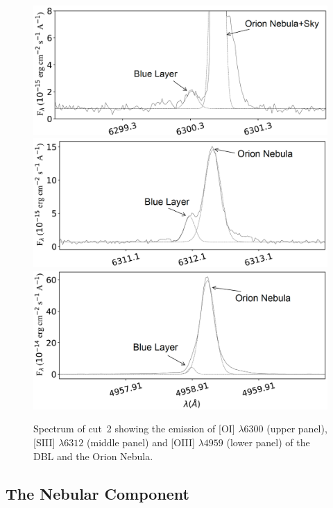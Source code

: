 \documentclass[twocolumn,linenumbers]{aastex63}
\newcommand{\jorge}[1]{{\color{magenta}J: #1}}
\begin{document}
\begin{figure}
\centering
\includegraphics[width=\columnwidth]{cut2_6300.pdf}
\includegraphics[width=\columnwidth]{cut2_6312.pdf}
\includegraphics[width=\columnwidth]{cut2_4959.pdf}
\caption{Spectrum of cut~2 showing the emission of [O\thinspace I] $\lambda 6300$ (upper panel), [S\thinspace III] $\lambda 6312$ (middle panel) and [O\thinspace III] $\lambda 4959$ (lower panel) of the DBL and the Orion Nebula.}
\label{fig:cut2_6300_6312_4959}
\end{figure}

\subsection{The Nebular Component}
\label{subsec:disc_nebular}
\end{document}
